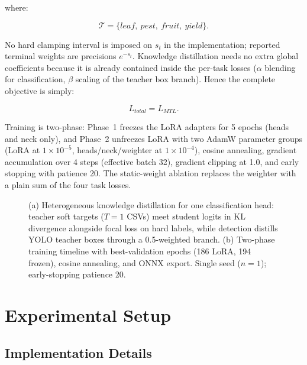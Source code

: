 \documentclass[preprint,12pt]{elsarticle}
\begin{document}
where:

\begin{equation}
\mathcal{T}
=
\{
leaf,\ pest,\ fruit,\ yield
\}.
\end{equation}

No hard clamping interval is imposed on $s_t$ in the implementation;
reported terminal weights are precisions $e^{-s_t}$. Knowledge
distillation needs no extra global coefficients because it is already
contained inside the per-task losses ($\alpha$ blending for
classification, $\beta$ scaling of the teacher box branch). Hence the
complete objective is simply:

\begin{equation}
L_{total}
=
L_{MTL}.
\end{equation}

Training is two-phase: Phase~1 freezes the LoRA adapters for 5 epochs
(heads and neck only), and Phase~2 unfreezes LoRA with two AdamW
parameter groups (LoRA at $1\times10^{-5}$, heads/neck/weighter at
$1\times10^{-4}$), cosine annealing, gradient accumulation over 4 steps
(effective batch 32), gradient clipping at 1.0, and early stopping with
patience 20. The static-weight ablation replaces the weighter with a
plain sum of the four task losses.

\begin{figure}[H]
\centering
\resizebox{\textwidth}{!}{}
\caption{(a) Heterogeneous knowledge distillation for one classification
head: teacher soft targets ($T{=}1$ CSVs) meet student logits in KL
divergence alongside focal loss on hard labels, while detection
distills YOLO teacher boxes through a 0.5-weighted branch.
(b) Two-phase training timeline with best-validation epochs (186 LoRA,
194 frozen), cosine annealing, and ONNX export. Single seed ($n{=}1$);
early-stopping patience 20.}
\label{fig:loss}
\end{figure}


\section{Experimental Setup}
\label{sec:experimental}

\subsection{Implementation Details}
\end{document}
